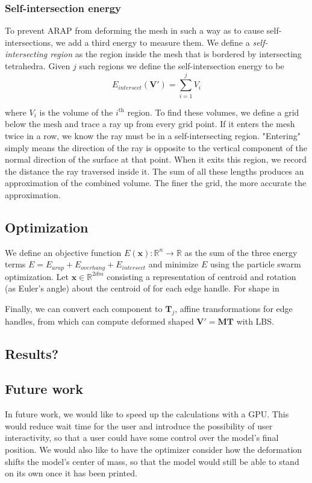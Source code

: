 \documentclass[10pt]{article}
\newcommand{\R}{\mathbb{R}}
\newcommand{\bV}{\mathbf{V}}
\newcommand{\bM}{\mathbf{M}}
\newcommand{\bT}{\mathbf{T}}
\newcommand{\bx}{\mathbf{x}}
\begin{document}
\subsubsection*{Self-intersection energy}

To prevent ARAP from deforming the mesh in such a way as to cause self-intersections, we add a third energy to measure them. We define a \textit{self-intersecting region} as the region inside the mesh that is bordered by intersecting tetrahedra. Given $j$ such regions we define the self-intersection energy to be
\[
	E_{intersect}(\bV') = \sum_{i=1}^j V_i
\]

where $V_i$ is the volume of the $i^{\text{th}}$ region. To find these volumes, we define a grid below the mesh and trace a ray up from every grid point. If it enters the mesh twice in a row, we know the ray must be in a self-intersecting region. "Entering" simply means the direction of the ray is opposite to the vertical component of the normal direction of the surface at that point. When it exits this region, we record the distance the ray traversed inside it. The sum of all these lengths produces an approximation of the combined volume. The finer the grid, the more accurate the approximation.


\subsection*{Optimization}

We define an objective function $E(\bx): \R^n \rightarrow \R$ as the sum of the three energy terms $E = E_{arap} + E_{overhang} + E_{intersect}$
and minimize $E$ using the particle swarm optimization. Let $\bx \in \R^{2dm}$ consisting a representation of centroid and rotation (as Euler's angle) about the centroid of for each edge handle. For shape in 

Finally, we can convert each component to $\bT_j$, affine transformations for edge handles, from which can compute deformed shaped $\bV' = \bM \bT$ with LBS.

\subsection*{Results?}

\subsection*{Future work}
In future work, we would like to speed up the calculations with a GPU. This would reduce wait time for the user and introduce the possibility of user interactivity, so that a user could have some control over the model's final position. We would also like to have the optimizer consider how the deformation shifts the model's center of mass, so that the model would still be able to stand on its own once it has been printed.


\end{document}
